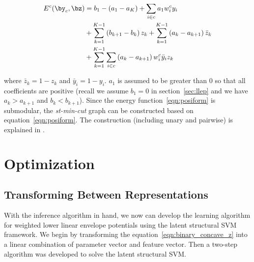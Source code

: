 \documentclass[sigconf]{acmart}
\renewcommand{\cite}{\citep}
\begin{document}
\begin{align}
  \label{eqn:posiform}  
  E^c(\by_c, \bz)
  &= b_1 - (a_1 - a_K) + \sum_{i \in c} a_1 w^c_i y_i \notag\\
  & + \sum_{k = 1}^{K - 1} \left( b_{k+1} - b_k \right) z_k
    + \sum_{k = 1}^{K - 1} \left( a_k - a_{k+1} \right)
    \bar{z}_k\notag\\
  & + \sum_{k = 1}^{K - 1} \sum_{i \in c} \left( a_k - a_{k+1}
    \right) w^c_i \bar{y}_i z_k
\end{align}

\noindent where $\bar{z}_k = 1 - z_k$ and $\bar{y}_i = 1 - y_i$.
$a_1$ is assumed to be greater than $0$ so that all coefficients
are positive (recall we assume $b_1=0$ in section~\ref{sec:llep}
and we have $a_k > a_{k+1}$ and $b_k < b_{k+1}$). Since the energy function~\eqref{eqn:posiform}
is submodular, the \emph{st-min-cut} graph can be constructed 
based on equation~\eqref{eqn:posiform}. The construction (including 
unary and pairwise) is explained in . 


\section{Optimization}
\label{sec:opt}

\subsection{Transforming Between Representations}
\label{sec:learning}
With the inference algorithm in hand, we now can develop the
learning algorithm for weighted lower linear envelope potentials
using the latent structural SVM framework. We begin by
transforming the equation~\eqref{eqn:binary_concave_z} into a
linear combination of parameter vector and feature vector. Then a
two-step algorithm was developed to solve the latent structural
SVM.
\end{document}
